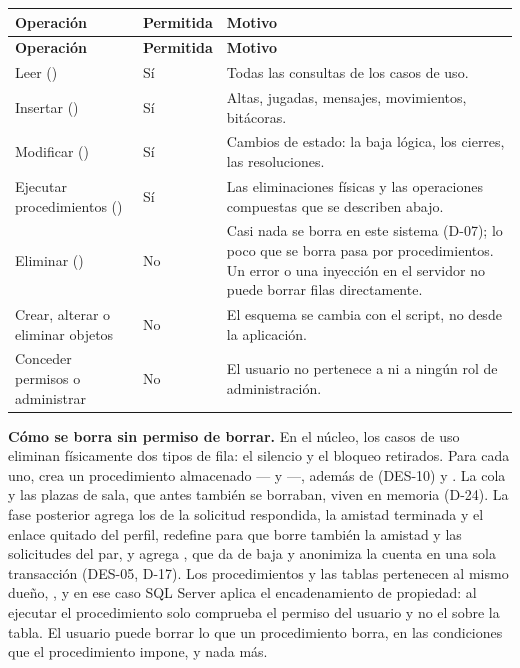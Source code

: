 \begin{center}\small
\begin{longtable}{|L{0.30\textwidth}|L{0.12\textwidth}|L{0.48\textwidth}|}
\hline
\textbf{Operación} & \textbf{Permitida} & \textbf{Motivo} \\ \hline
\endfirsthead
\hline
\textbf{Operación} & \textbf{Permitida} & \textbf{Motivo} \\ \hline
\endhead
Leer () & Sí & Todas las consultas de los casos de uso. \\ \hline
Insertar () & Sí & Altas, jugadas, mensajes, movimientos, bitácoras. \\ \hline
Modificar () & Sí & Cambios de estado: la baja lógica, los cierres, las resoluciones. \\ \hline
Ejecutar procedimientos () & Sí & Las eliminaciones físicas y las operaciones compuestas que se describen abajo. \\ \hline
Eliminar () & No & Casi nada se borra en este sistema (\mbox{D-07}); lo poco que se borra pasa por procedimientos. Un error o una inyección en el servidor no puede borrar filas directamente. \\ \hline
Crear, alterar o eliminar objetos & No & El esquema se cambia con el script, no desde la aplicación. \\ \hline
Conceder permisos o administrar & No & El usuario no pertenece a  ni a ningún rol de administración. \\ \hline
\end{longtable}
\end{center}

\textbf{Cómo se borra sin permiso de borrar.} En el núcleo, los casos de uso eliminan físicamente dos tipos de fila: el silencio y el bloqueo retirados. Para cada uno,  crea un procedimiento almacenado — y —, además de  (\mbox{DES-10}) y . La cola y las plazas de sala, que antes también se borraban, viven en memoria (\mbox{D-24}). La fase posterior agrega los de la solicitud respondida, la amistad terminada y el enlace quitado del perfil, redefine  para que borre también la amistad y las solicitudes del par, y agrega , que da de baja y anonimiza la cuenta en una sola transacción (\mbox{DES-05}, \mbox{D-17}). Los procedimientos y las tablas pertenecen al mismo dueño, , y en ese caso SQL Server aplica el encadenamiento de propiedad: al ejecutar el procedimiento solo comprueba el permiso  del usuario y no el  sobre la tabla. El usuario puede borrar lo que un procedimiento borra, en las condiciones que el procedimiento impone, y nada más.

